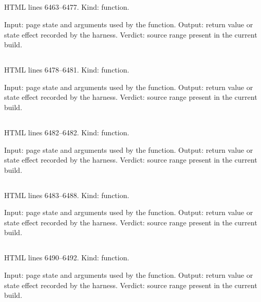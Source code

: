 \subsection*{\texttt{}}
\label{vf_307_ccRowsFromRuns}
HTML lines 6463--6477. Kind: function.

Input: page state and arguments used by the function.
Output: return value or state effect recorded by the harness.
Verdict: source range present in the current build.

\subsection*{\texttt{}}
\label{vf_308_ccAllRows}
HTML lines 6478--6481. Kind: function.

Input: page state and arguments used by the function.
Output: return value or state effect recorded by the harness.
Verdict: source range present in the current build.

\subsection*{\texttt{}}
\label{vf_309_ccInstruments}
HTML lines 6482--6482. Kind: function.

Input: page state and arguments used by the function.
Output: return value or state effect recorded by the harness.
Verdict: source range present in the current build.

\subsection*{\texttt{}}
\label{vf_310_ccRowsFor}
HTML lines 6483--6488. Kind: function.

Input: page state and arguments used by the function.
Output: return value or state effect recorded by the harness.
Verdict: source range present in the current build.

\subsection*{\texttt{}}
\label{vf_311_ccVariants}
HTML lines 6490--6492. Kind: function.

Input: page state and arguments used by the function.
Output: return value or state effect recorded by the harness.
Verdict: source range present in the current build.

